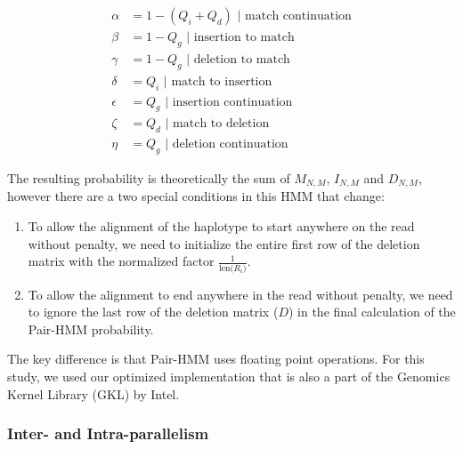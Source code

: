 \begin{align*}
    \alpha   &= 1 - (Q_i + Q_d) \text{ | match continuation} \\
    \beta    &= 1 - Q_g \text{ | insertion to match} \\
    \gamma   &= 1 - Q_g \text{ | deletion to match} \\
    \delta   &= Q_i \text{ | match to insertion} \\
    \epsilon &= Q_g \text{ | insertion continuation} \\
    \zeta    &= Q_d \text{ | match to deletion} \\
    \eta     &= Q_g \text{ | deletion continuation}
\end{align*}

The resulting probability is theoretically the sum of $M_{N,M}$, $I_{N,M}$ and $D_{N,M}$, however there are a two special conditions in this HMM that change:

\begin{enumerate}

\item To allow the alignment of the haplotype to start anywhere on the read without penalty, we need to initialize the entire first row of the deletion matrix with the normalized factor $\frac{1}{\text{len(}R_i\text{)}}$.

\item To allow the alignment to end anywhere in the read without penalty, we need to ignore the last row of the deletion matrix ($D$) in the final calculation of the Pair-HMM probability.

\end{enumerate}

The key difference is that Pair-HMM uses floating point operations. For this study, we used our optimized implementation that is also a part of the Genomics Kernel Library (GKL) by Intel.

\subsubsection{Inter- and Intra-parallelism}

